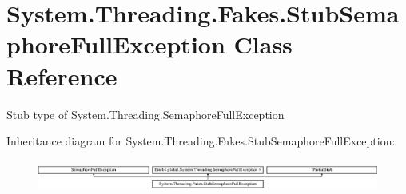 \hypertarget{class_system_1_1_threading_1_1_fakes_1_1_stub_semaphore_full_exception}{\section{System.\-Threading.\-Fakes.\-Stub\-Semaphore\-Full\-Exception Class Reference}
\label{class_system_1_1_threading_1_1_fakes_1_1_stub_semaphore_full_exception}
}


Stub type of System.\-Threading.\-Semaphore\-Full\-Exception 


Inheritance diagram for System.\-Threading.\-Fakes.\-Stub\-Semaphore\-Full\-Exception\-:\begin{figure}[H]
\begin{center}
\leavevmode
\includegraphics[height=1.051643cm]{class_system_1_1_threading_1_1_fakes_1_1_stub_semaphore_full_exception}
\end{center}
\end{figure}
